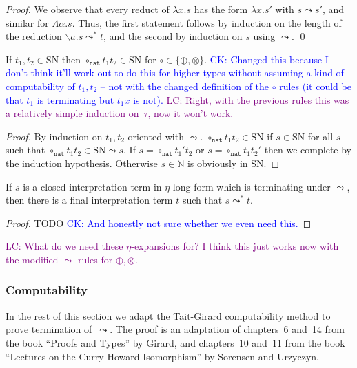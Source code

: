 \documentclass[runningheads,a4paper]{llncs}
\newcommand{\abs}[2]{\lambda #1.#2}
\newcommand{\tabs}[2]{\Lambda #1.#2}
\newcommand{\abstraction}[2]{\backslash #1.#2}
\newcommand{\nat}{\mathtt{nat}}
\newcommand{\SN}{\mathrm{SN}}
\newcommand{\CK}[1]{\textcolor{blue}{CK: #1}}
\newcommand{\LC}[1]{\textcolor{purple}{LC: #1}}
\begin{document}
\begin{proof}
We observe that every reduct of $\abs{x}{s}$ has the form $\abs{x}{s'}$
with $s \leadsto s'$, and similar for $\tabs{\alpha}{s}$.
Thus, the first statement follows by induction on the length of the
reduction $\abstraction{a}{s} \leadsto^* t$, and the second by induction
on $s$ using $\leadsto$.
\qed
\end{proof}

\begin{lemma}\label{lem_circ_sn_base}
  If $t_1,t_2 \in \SN$ then $\circ_\nat t_1 t_2 \in \SN$ for
  $\circ \in \{\oplus,\otimes\}$.
  \CK{Changed this because I don't think it'll work out to do this for
  higher types without assuming a kind of computability of $t_1,t_2$ --
  not with the changed definition of the $\circ$ rules (it could be
  that $t_1$ is terminating but $t_1 x$ is not).} \LC{Right, with the
  previous rules this was a relatively simple induction on~$\tau$, now
  it won't work.}
\end{lemma}

\begin{proof}
  By induction on $t_1,t_2$ oriented with $\leadsto$.
  $\circ_\nat t_1 t_2 \in \SN$ if $s \in \SN$ for all $s$ such that
  $\circ_\nat t_1 t_2 \in \SN \leadsto s$.  If
  $s = \circ_\nat t_1' t_2$ or $s = \circ_\nat t_1 t_2'$ then we
  complete by the induction hypothesis. Otherwise $s \in \mathbb{N}$
  is obviously in $\SN$.
\end{proof}

\begin{lemma}
If $s$ is a closed interpretation term in $\eta$-long form which is
terminating under $\leadsto$, then there is a final interpretation term
$t$ such that $s \leadsto^* t$.
\end{lemma}

\begin{proof}
TODO
\CK{And honestly not sure whether we even need this.}
\end{proof}

\LC{What do we need these $\eta$-expansions for? I think this just
  works now with the modified $\leadsto$-rules for $\oplus,\otimes$.}

\subsubsection{Computability}
In the rest of this section we adapt the Tait-Girard computability
method to prove termination of~$\leadsto$. The proof is an adaptation
of chapters~6 and~14 from the book ``Proofs and Types'' by Girard, and
chapters~10 and~11 from the book ``Lectures on the Curry-Howard
Isomorphism'' by Sorensen and Urzyczyn.
\end{document}
